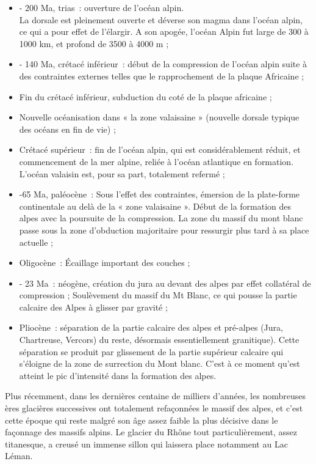 \documentclass[a4paper,11pt]{article}
\begin{document}
\begin{itemize}
  \item - 200 Ma, trias~: ouverture de l'océan alpin.\\
  La dorsale est pleinement ouverte et déverse son  magma dans l'océan alpin, ce qui a pour effet de l'élargir.
  A son apogée, l'océan Alpin fut large de 300 à 1000 km, et profond de 3500 à 4000 m ;
  \item - 140 Ma, crétacé inférieur~: début de la compression de l'océan alpin suite à des contraintes externes telles que le rapprochement de la plaque Africaine ;
  \item Fin du crétacé inférieur, subduction du coté de la plaque africaine ;
  \item Nouvelle océanisation dans « la zone valaisaine » (nouvelle dorsale typique des océans en fin de vie) ;
  \item Crétacé supérieur~: fin de l'océan alpin, qui est considérablement réduit, et commencement de la mer alpine, reliée à l'océan atlantique en formation. L'océan valaisin est, pour sa part, totalement refermé ;
  \item -65 Ma, paléocène~: Sous l'effet des contraintes, émersion de la plate-forme continentale au delà de la « zone valaisaine ».
  Début de la formation des alpes avec la poursuite de la compression.
  La zone du massif du mont blanc passe sous la zone d'obduction majoritaire pour ressurgir plus tard à sa place actuelle ;
  \item Oligocène~: Écaillage important des couches ;
  \item - 23 Ma~: néogène, création du jura au devant des alpes par effet collatéral de compression ;
  Soulèvement du massif du Mt Blanc, ce qui pousse la partie calcaire des Alpes à glisser par gravité ;
  \item Pliocène~: séparation de la partie calcaire des alpes et pré-alpes (Jura, Chartreuse, Vercors) du reste, désormais essentiellement granitique). Cette séparation se produit par glissement de la partie supérieur calcaire qui s'éloigne de la zone de surrection du Mont blanc.
  C'est à ce moment qu'est atteint le pic d'intensité dans la formation des alpes.
\end{itemize}
Plus récemment, dans les dernières centaine de milliers d'années, les nombreuses ères glacières successives ont totalement refaçonnées le massif des alpes, et c'est cette époque qui reste malgré son âge assez faible la plus décisive dans le façonnage des massifs alpins.
  Le glacier du Rhône tout particulièrement, assez titanesque, a creusé un immense sillon qui laissera place notamment au Lac Léman. 
\end{document}
